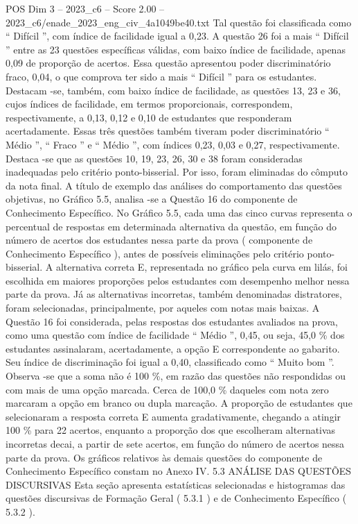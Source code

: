 \begin{textsample}{POS Dim 3 – 2023\_c6 – Score 2.00 – 2023\_c6/enade\_2023\_eng\_civ\_4a1049be40.txt}
Tal questão foi classificada como “ Difícil ”, com índice de facilidade igual a 0,23.
A questão 26 foi a mais “ Difícil ” entre as 23 questões específicas válidas, com baixo índice de facilidade, apenas 0,09 de proporção de acertos.
Essa questão apresentou poder discriminatório fraco, 0,04, o que comprova ter sido a mais “ Difícil ” para os estudantes.
Destacam -se, também, com baixo índice de facilidade, as questões 13, 23 e 36, cujos índices de facilidade, em termos proporcionais, correspondem, respectivamente, a 0,13, 0,12 e 0,10 de estudantes que responderam acertadamente.
Essas três questões também tiveram poder discriminatório “ Médio ”, “ Fraco ” e “ Médio ”, com índices 0,23, 0,03 e 0,27, respectivamente.
Destaca -se que as questões 10, 19, 23, 26, 30 e 38 foram consideradas inadequadas pelo critério ponto-bisserial.
Por isso, foram eliminadas do cômputo da nota final.
A título de exemplo das análises do comportamento das questões objetivas, no Gráfico 5.5, analisa -se a Questão 16 do componente de Conhecimento Específico.
No Gráfico 5.5, cada uma das cinco curvas representa o percentual de respostas em determinada alternativa da questão, em função do número de acertos dos estudantes nessa parte da prova ( componente de Conhecimento Específico ), antes de possíveis eliminações pelo critério ponto-bisserial.
A alternativa correta E, representada no gráfico pela curva em lilás, foi escolhida em maiores proporções pelos estudantes com desempenho melhor nessa parte da prova.
Já as alternativas incorretas, também denominadas distratores, foram selecionadas, principalmente, por aqueles com notas mais baixas.
A Questão 16 foi considerada, pelas respostas dos estudantes avaliados na prova, como uma questão com índice de facilidade “ Médio ”, 0,45, ou seja, 45,0 \% dos estudantes assinalaram, acertadamente, a opção E correspondente ao gabarito.
Seu índice de discriminação foi igual a 0,40, classificado como “ Muito bom ”.
Observa -se que a soma não é 100 \%, em razão das questões não respondidas ou com mais de uma opção marcada.
Cerca de 100,0 \% daqueles com nota zero marcaram a opção em branco ou dupla marcação.
A proporção de estudantes que selecionaram a resposta correta E aumenta gradativamente, chegando a atingir 100 \% para 22 acertos, enquanto a proporção dos que escolheram alternativas incorretas decai, a partir de sete acertos, em função do número de acertos nessa parte da prova.
Os gráficos relativos às demais questões do componente de Conhecimento Específico constam no Anexo IV. 5.3 ANÁLISE DAS QUESTÕES DISCURSIVAS Esta seção apresenta estatísticas selecionadas e histogramas das questões discursivas de Formação Geral ( 5.3.1 ) e de Conhecimento Específico ( 5.3.2 ).

\end{textsample}
